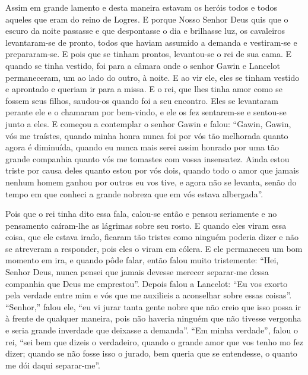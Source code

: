 Assim em grande lamento e desta maneira estavam os heróis todos e todos aqueles
que eram do reino de Logres. E porque Nosso Senhor Deus quis que o escuro da
noite passasse e que despontasse o dia e brilhasse luz, os cavaleiros
levantaram-se de pronto, todos que haviam assumido a demanda e vestiram-se e
prepararam-se. E pois que se tinham prontos, levantou-se o rei de sua cama. E
quando se tinha vestido, foi para a câmara onde o senhor Gawin e Lancelot
permaneceram, um ao lado do outro, à noite. E ao vir ele, eles se tinham
vestido e aprontado e queriam ir para a missa. E o rei, que lhes tinha amor
como se fossem seus filhos, saudou-os quando foi a seu encontro. Eles se
levantaram perante ele e o chamaram por bem-vindo, e ele os fez sentarem-se e
sentou-se junto a eles. E começou a contemplar o senhor Gawin e falou: “Gawin,
Gawin, vós me traístes, quando minha honra nunca foi por vós tão melhorada
quanto agora é diminuída, quando eu nunca mais serei assim honrado por uma tão
grande companhia quanto vós me tomastes com vossa insensatez. Ainda estou
triste por causa deles quanto estou por vós dois, quando todo o amor que jamais
nenhum homem ganhou por outros eu vos tive, e agora não se levanta, senão do
tempo em que conheci a grande nobreza que em vós estava albergada”. 

Pois que o rei tinha dito essa fala, calou-se então e pensou seriamente e no
pensamento caíram-lhe as lágrimas sobre seu rosto. E quando eles viram essa
coisa, que ele estava irado, ficaram tão tristes como ninguém poderia dizer e
não se atreveram a responder, pois eles o viram em cólera. E ele permaneceu um
bom momento em ira, e quando pôde falar, então falou muito tristemente: “Hei,
Senhor Deus, nunca pensei que jamais devesse merecer separar-me dessa companhia
que Deus me emprestou”. Depois falou a Lancelot: “Eu vos exorto pela verdade
entre mim e vós que me auxilieis a aconselhar sobre essas coisas”. “Senhor,”
falou ele, “eu vi jurar tanta gente nobre que não creio que isso possa ir à
frente de qualquer maneira, pois não haveria ninguém que não tivesse vergonha e
seria grande inverdade que deixasse a demanda”. “Em minha verdade”,
falou o rei, “sei bem que dizeis o verdadeiro, quando o grande amor que vos
tenho mo fez dizer; quando se não fosse isso o jurado, bem queria que se
entendesse, o quanto me dói daqui separar-me”.

